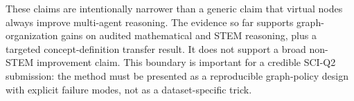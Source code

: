 These claims are intentionally narrower than a generic claim that virtual nodes always improve multi-agent reasoning. The evidence so far supports graph-organization gains on audited mathematical and STEM reasoning, plus a targeted concept-definition transfer result. It does not support a broad non-STEM improvement claim. This boundary is important for a credible SCI-Q2 submission: the method must be presented as a reproducible graph-policy design with explicit failure modes, not as a dataset-specific trick.

